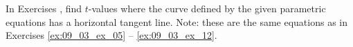 {\noindent In Exercises}
{, find $t$-values where the curve defined by the given parametric equations has a horizontal tangent line. Note: these are the same equations as in Exercises \ref{ex:09_03_ex_05} -- \ref{ex:09_03_ex_12}.
}

